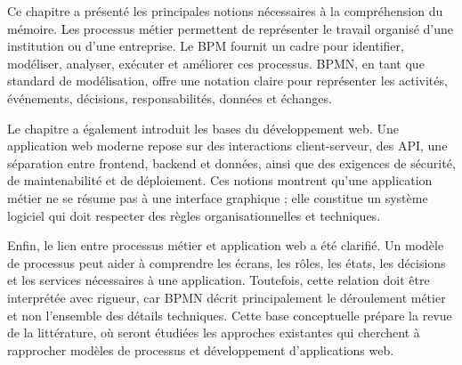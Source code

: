 
Ce chapitre a présenté les principales notions nécessaires à la compréhension du mémoire. Les processus métier permettent de représenter le travail organisé d'une institution ou d'une entreprise. Le BPM fournit un cadre pour identifier, modéliser, analyser, exécuter et améliorer ces processus. BPMN, en tant que standard de modélisation, offre une notation claire pour représenter les activités, événements, décisions, responsabilités, données et échanges.

Le chapitre a également introduit les bases du développement web. Une application web moderne repose sur des interactions client-serveur, des API, une séparation entre frontend, backend et données, ainsi que des exigences de sécurité, de maintenabilité et de déploiement. Ces notions montrent qu'une application métier ne se résume pas à une interface graphique ; elle constitue un système logiciel qui doit respecter des règles organisationnelles et techniques.

Enfin, le lien entre processus métier et application web a été clarifié. Un modèle de processus peut aider à comprendre les écrans, les rôles, les états, les décisions et les services nécessaires à une application. Toutefois, cette relation doit être interprétée avec rigueur, car BPMN décrit principalement le déroulement métier et non l'ensemble des détails techniques. Cette base conceptuelle prépare la revue de la littérature, où seront étudiées les approches existantes qui cherchent à rapprocher modèles de processus et développement d'applications web.
